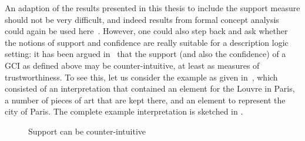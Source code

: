 An adaption of the results presented in this thesis to include the support measure should
not be very difficult, and indeed results from formal concept analysis could again be used
here~\cite{DBLP:conf/ki/StummeTBPL01,arules:Stumme:2002}.  However, one could also step
back and ask whether the notions of support and confidence are really suitable for a
description logic setting: it has been argued in~\cite{DBLP:conf/icdm/BorchmannD11} that
the support (and also the confidence) of a GCI as defined above may be counter-intuitive,
at least as measures of trustworthiness.  To see this, let us consider the example as
given in~\cite{DBLP:conf/icdm/BorchmannD11}, which consisted of an interpretation that
contained an element for the Louvre in Paris, a number of pieces of art that are kept
there, and an element to represent the city of Paris.  The complete example interpretation
is sketched in .

\begin{figure}[t]
  \centering
  \caption{Support can be counter-intuitive}
  \label{fig:support-of-gcis-can-be-counter-intuitive}
\end{figure}

